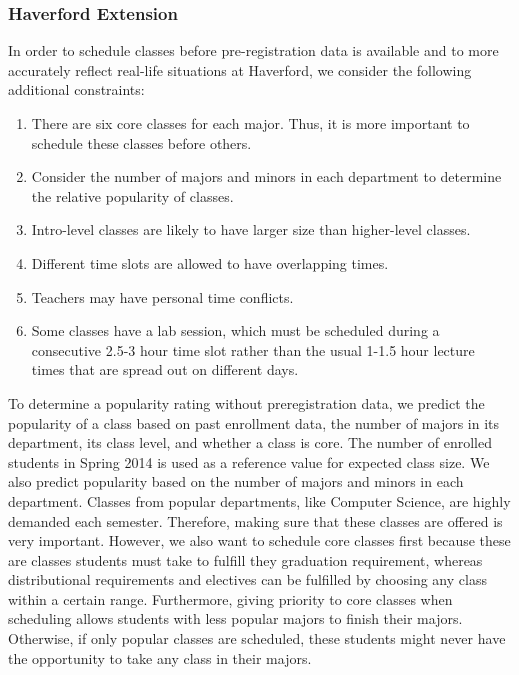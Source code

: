 \documentclass[11pt, oneside]{article}   	%
\begin{document}
\subsubsection{Haverford Extension}
In order to schedule classes before pre-registration data is available and to more accurately reflect real-life situations at Haverford, we consider the following additional constraints:
\begin{enumerate}
\item There are six core classes for each major. Thus, it is more important to schedule these classes before others.
\item Consider the number of majors and minors in each department to determine the relative popularity of classes.
\item Intro-level classes are likely to have larger size than higher-level classes.
\item Different time slots are allowed to have overlapping times.
\item Teachers may have personal time conflicts.
\item Some classes have a lab session, which must be scheduled during a consecutive 2.5-3 hour time slot rather than the usual 1-1.5 hour lecture times that are spread out on different days.
\end{enumerate}
\par To determine a popularity rating without preregistration data, we predict the popularity of a class based on past enrollment data, the number of majors in its department, its class level, and whether a class is core. The number of enrolled students in Spring 2014 is used as a reference value for expected class size. We also predict popularity based on the number of majors and minors in each department. Classes from popular departments, like Computer Science, are highly demanded each semester. Therefore, making sure that these classes are offered is very important. However, we also want to schedule core classes first because these are classes students must take to fulfill they graduation requirement, whereas distributional requirements and electives can be fulfilled by choosing any class within a certain range. Furthermore, giving priority to core classes when scheduling allows students with less popular majors to finish their majors. Otherwise, if only popular classes are scheduled, these students might never have the opportunity to take any class in their majors. 
\end{document}
